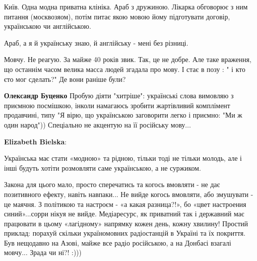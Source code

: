 \begin{itemize}
 

Київ. Одна модна приватна клініка. Араб з дружиною. Лікарка обговорює з ним
питання (москвозяом), потім питає якою мовою йому підготувати договір,
українською чи англійською.

Араб, а я й українську знаю, й англійську - мені без різниці.


 

\obeycr
Мовчу. Не реагую. За майже 40 років звик.
Так, це не добре.
Але таке враження, що останнім часом велика масса людей згадала про мову.
І стає в позу : " і кто єто мог сделать?"
Де вони раніше були?
\restorecr

\begin{itemize}
 
\textbf{Олександр Буценко} Пробую діяти "хитріше": українські слова вимовляю з
приємною посмішкою, інколи намагаюсь зробити жартівливий комплімент продавчині,
типу "Я вірю, що українською заговорити легко і приємно: "Ми ж один народ"))
Спеціально не акцентую на її російську мову...
\end{itemize}

 
\textbf{Elizabeth Bielska}: 

Українська має стати «модною» та рідною, тільки тоді не тільки молодь, але і
інші будуть хотіти розмовляти саме українською, а не суржиком.

Закона для цього мало, просто сперечатись та когось вмовляти - не дає
позитивного ефекту, навіть навпаки... Не вийде когось вмовляти, або змушувати -
це маячня. З політикою та настроєм - «а какая разница?!», бо «цвет настроения
синий»...сорри нікуя не вийде. Медіаресурс, як приватний так і державний має
працювати в цьому «лагідному» напрямку кожен день, кожну хвилину! Простий
приклад: порахуй скільки україномовних радіостанцій в Україні та їх покриття.
Був нещодавно на Азові, майже все радіо російською, а на Донбасі взагалі
мовчу... Зрада чи ні?! :)))



\end{itemize}
